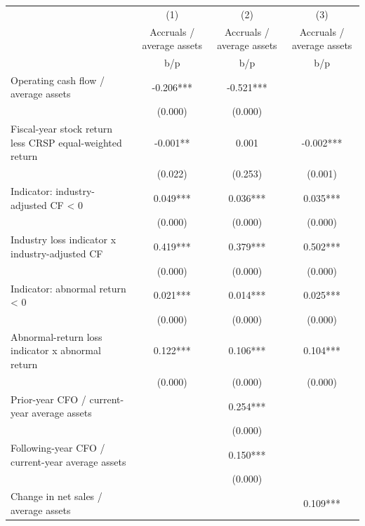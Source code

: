 {
\def\sym#1{\ifmmode^{#1}\else\(^{#1}\)\fi}
\begin{tabular}{l*{3}{c}}
\hline\hline
                    &\multicolumn{1}{c}{(1)}&\multicolumn{1}{c}{(2)}&\multicolumn{1}{c}{(3)}\\
                    &\multicolumn{1}{c}{Accruals / average assets}&\multicolumn{1}{c}{Accruals / average assets}&\multicolumn{1}{c}{Accruals / average assets}\\
                    &         b/p   &         b/p   &         b/p   \\
\hline
Operating cash flow / average assets&      -0.206***&      -0.521***&               \\
                    &     (0.000)   &     (0.000)   &               \\
Fiscal-year stock return less CRSP equal-weighted return&      -0.001** &       0.001   &      -0.002***\\
                    &     (0.022)   &     (0.253)   &     (0.001)   \\
Indicator: industry-adjusted CF < 0&       0.049***&       0.036***&       0.035***\\
                    &     (0.000)   &     (0.000)   &     (0.000)   \\
Industry loss indicator x industry-adjusted CF&       0.419***&       0.379***&       0.502***\\
                    &     (0.000)   &     (0.000)   &     (0.000)   \\
Indicator: abnormal return < 0&       0.021***&       0.014***&       0.025***\\
                    &     (0.000)   &     (0.000)   &     (0.000)   \\
Abnormal-return loss indicator x abnormal return&       0.122***&       0.106***&       0.104***\\
                    &     (0.000)   &     (0.000)   &     (0.000)   \\
Prior-year CFO / current-year average assets&               &       0.254***&               \\
                    &               &     (0.000)   &               \\
Following-year CFO / current-year average assets&               &       0.150***&               \\
                    &               &     (0.000)   &               \\
Change in net sales / average assets&               &               &       0.109***\\

\end{tabular}}
